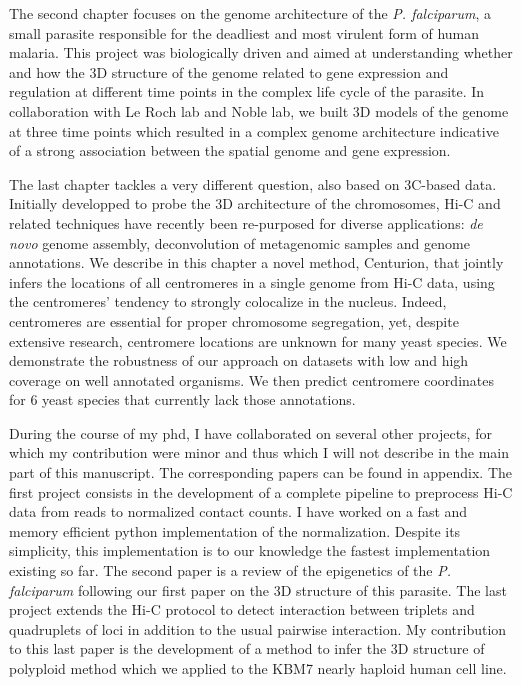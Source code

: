 \begin{abstracts}
The second chapter focuses on the genome architecture of the {\em P.
falciparum}, a small parasite responsible for the deadliest and most virulent
form of human malaria. This project was biologically driven and aimed at
understanding whether and how the 3D structure of the genome related to gene
expression and regulation at different time points in the complex life cycle
of the parasite. In collaboration with Le Roch lab and Noble lab, we built 3D
models of the genome at three time points which resulted in a complex genome
architecture indicative of a strong association between the spatial genome and
gene expression.

The last chapter tackles a very different question, also based on 3C-based
data. Initially developped to probe the 3D architecture of the chromosomes,
Hi-C and related techniques have recently been re-purposed for diverse
applications: \textit{de novo} genome assembly, deconvolution of metagenomic
samples and genome annotations. We describe in this chapter a novel method,
Centurion, that jointly infers the locations of all centromeres in a single
genome from Hi-C data, using the centromeres' tendency to strongly colocalize
in the nucleus.  Indeed, centromeres are essential for proper chromosome
segregation, yet, despite extensive research, centromere locations are unknown
for many yeast species. We demonstrate the robustness of our approach on
datasets with low and high coverage on well annotated organisms. We then
predict centromere coordinates for 6 yeast species that currently lack those
annotations.

During the course of my phd, I have collaborated on several other projects,
for which my contribution were minor and thus which I will not describe in the
main part of this manuscript. The corresponding papers can be found in
appendix. The first project consists in the development of a complete pipeline
to preprocess Hi-C data from reads to normalized contact counts. I have worked
on a fast and memory efficient python implementation of the normalization.
Despite its simplicity, this implementation is to our
knowledge the fastest implementation existing so far. The second paper is a
review of the epigenetics of the {\em P. falciparum} following our first paper
on the 3D structure of this parasite. The last project extends the Hi-C
protocol to detect interaction between triplets and quadruplets of loci in
addition to the usual pairwise interaction. My contribution to this last paper
is the development of a method to infer the 3D structure of polyploid method
which we applied to the KBM7 nearly haploid human cell line.


\end{abstracts}


